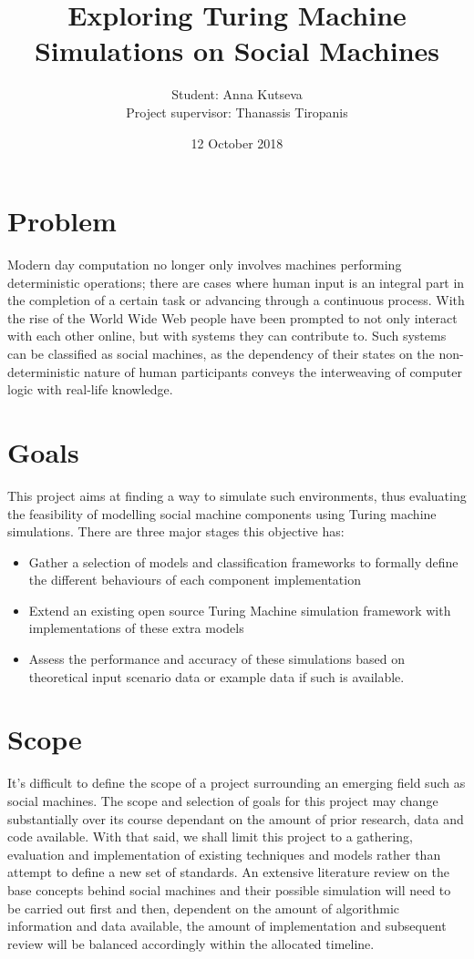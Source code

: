 \documentclass[12pt,a4paper]{article}
\title{Exploring Turing Machine Simulations on Social Machines}
\author{Student: Anna Kutseva\\
	Project supervisor: Thanassis Tiropanis}
\date{12 October 2018}
\begin{document}
	\maketitle
	\section*{Problem}
		Modern day computation no longer only involves machines performing deterministic operations; there are cases where human input is an integral part in the completion of a certain task or advancing through a continuous process. With the rise of the World Wide Web people have been prompted to not only interact with each other online, but with systems they can contribute to. Such systems can be classified as social machines, as the dependency of their states on the non-deterministic nature of human participants conveys the interweaving of computer logic with real-life knowledge.

	\section*{Goals}
		This project aims at finding a way to simulate such environments, thus evaluating the feasibility of modelling social machine components using Turing machine simulations.
		There are three major stages this objective has:
		\begin{itemize}
			\item Gather a selection of models and classification frameworks to formally define the different behaviours of each component implementation
			\item Extend an existing open source Turing Machine simulation framework with implementations of these extra models
			\item Assess the performance and accuracy of these simulations based on theoretical input scenario data or example data if such is available.
		\end{itemize}
	
	\section*{Scope}
		It's difficult to define the scope of a project surrounding an emerging field such as social machines. The scope and selection of goals for this project may change substantially over its course dependant on the amount of prior research, data and code available. With that said, we shall limit this project to a gathering, evaluation and implementation of existing techniques and models rather than attempt to define a new set of standards. An extensive literature review on the base concepts behind social machines and their possible simulation will need to be carried out first and then, dependent on the amount of algorithmic information and data available, the amount of implementation and subsequent review will be balanced accordingly within the allocated timeline.
\end{document}
